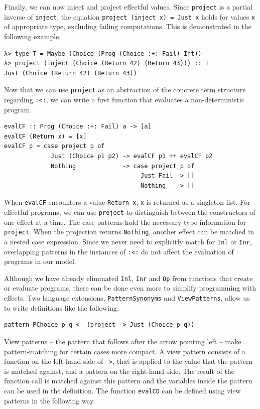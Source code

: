 \documentclass[a4paper, 11pt, fleqn, twoside, abstract=on]{scrreprt}
\newcommand{\hinl}[1]{\texttt{#1}}
\begin{document}
Finally, we can now inject and project effectful values.
Since \hinl{project} is a partial inverse of \hinl{inject}, the equation \hinl{project (inject x) = Just x} holds for values \hinl{x} of appropriate type, excluding failing computations.
This is demonstrated in the following example.

\begin{verbatim}
λ> type T = Maybe (Choice (Prog (Choice :+: Fail) Int))
λ> project (inject (Choice (Return 42) (Return 43))) :: T
Just (Choice (Return 42) (Return 43))
\end{verbatim}

Now that we can use \hinl{project} as an abstraction of the concrete term structure regarding \hinl{:<:}, we can write a first function that evaluates a non-deterministic program.

\begin{verbatim}
evalCF :: Prog (Choice :+: Fail) a -> [a]
evalCF (Return x) = [x]
evalCF p = case project p of
             Just (Choice p1 p2) -> evalCF p1 ++ evalCF p2
             Nothing             -> case project p of
                                      Just Fail -> []
                                      Nothing   -> []
\end{verbatim}

When \hinl{evalCF} encounters a value \hinl{Return x}, \hinl{x} is returned as a singleton list.
For effectful programs, we can use \hinl{project} to distinguish between the constructors of one effect at a time.
The case patterns hold the necessary type information for \hinl{project}.
When the projection returns \hinl{Nothing}, another effect can be matched in a nested case expression.
Since we never need to explicitly match for \hinl{Inl} or \hinl{Inr}, overlapping patterns in the instances of \hinl{:<:} do not affect the evaluation of programs in our model.

Although we have already eliminated \hinl{Inl}, \hinl{Inr} and \hinl{Op} from functions that create or evaluate programs, there can be done even more to simplify programming with effects.
Two language extensions, \hinl{PatternSynonyms} and \hinl{ViewPatterns}, allow us to write definitions like the following.

\begin{verbatim}
pattern PChoice p q <- (project -> Just (Choice p q))
\end{verbatim}

View patterns -- the pattern that follows after the arrow pointing left -- make pattern-matching for certain cases more compact.
A view pattern consists of a function on the left-hand side of \hinl{->}, that is applied to the value that the pattern is matched against, and a pattern on the right-hand side.
The result of the function call is matched against this pattern and the variables inside the pattern can be used in the definition.
The function \hinl{evalCD} can be defined using view patterns in the following way.
\end{document}
